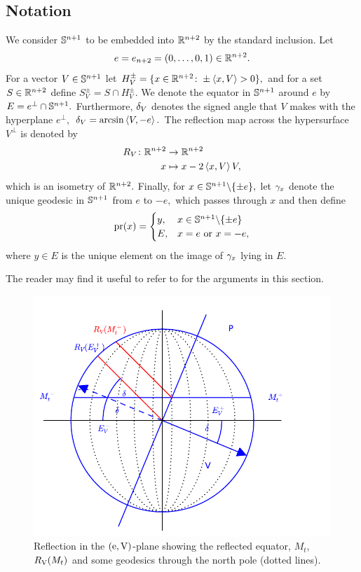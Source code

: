 \documentclass{amsart}
\begin{document}
\subsection{Notation}
We consider $\S^{n+1}$ to be embedded into $\R^{n+2}$ by the standard inclusion.
Let
$$e=e_{n+2}=\br{0,\dots,0,1}\in \R^{n+2}.$$
For a vector $V\in \S^{n+1}$ let
$H_{V}^{\pm}=\{x\in\R^{n+2}\cn \pm\inpr{x}{V}>0\},$ and
for a set $S\in \R^{n+2}$ define
$S^{\pm}_{V}=S\cap H^{\pm}_{V}.$ We denote the equator in $\S^{n+1}$ around $e$ by
$E=e^{\perp}\cap \S^{n+1}.$
Furthermore, $\d_{V}$ denotes the signed angle that $V$ makes with the hyperplane $e^{\perp},$
$\d_{V}=\arcsin\inpr{V}{-e}.$
The reflection map across the hypersurface $V^{\perp}$ is denoted by
\begin{align*}
R_{V}\cn\R^{n+2}&\ra \R^{n+2}\\
            x&\mt x-2\inpr{x}{V}V,
            \end{align*}
which is an isometry of $\R^{n+2}.$
Finally, for $x\in \S^{n+1}\bs\{\pm e\},$
let $\g_{x}$ denote the unique geodesic in $\S^{n+1}$ from $e$ to $-e,$ which passes through $x$ and then define
\begin{align*}
\pr(x)=\begin{cases} y, & x\in \S^{n+1}\bs\{\pm e\}\\
                E, & x=e~\text{or}~x=-e,\end{cases}
                \end{align*}
where $y\in E$ is the unique element on the image of $\g_{x}$ lying in $E.$

The reader may find it useful to refer to  for the arguments in this section.
\begin{figure}[htb]
\centering
\includegraphics[width=.9\linewidth]{./reflection.pdf}
\caption{Reflection in the $(\vertvec, \reflectionvector)$-plane showing the reflected equator, \(M_t\), \(\reflectionmap(M_t)\) and some geodesics through the north pole (dotted lines).}
\label{fig:reflection}
\end{figure}
\end{document}
